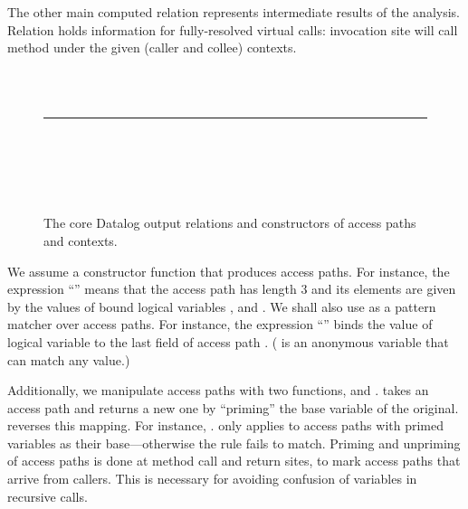 The other main computed relation represents intermediate results of the analysis. Relation  holds information for fully-resolved virtual calls: invocation site  will call method  under the given (caller and collee) contexts.

\begin{figure}[hp]
\begin{datalog}
 \\
 \\
%
\noindent\rule{\textwidth}{0.5pt}\\
%
 \\
 \\
 \\
\end{datalog}
\caption[]{The core Datalog output relations and constructors of access paths and contexts.}
\label{fig:must-logic:output}
\end{figure}



We assume a constructor function  that produces access paths. For instance, the expression ``'' means that the access path  has length 3 and its elements are given by the values of bound logical variables ,  and . We shall also use  as a pattern matcher over access paths. For instance, the expression ``'' binds the value of logical variable  to the last field of access path . (\args{\_} is an anonymous variable that can match any value.)

Additionally, we manipulate access paths with two functions,  and .  takes an access path and returns a new one by ``priming'' the base variable of the original.  reverses this mapping. For instance, .  only applies to access paths with primed variables as their base---otherwise the rule fails to match. Priming and unpriming of access paths is done at method call and return sites, to mark access paths that arrive from callers. This is necessary for avoiding confusion of variables in recursive calls.

